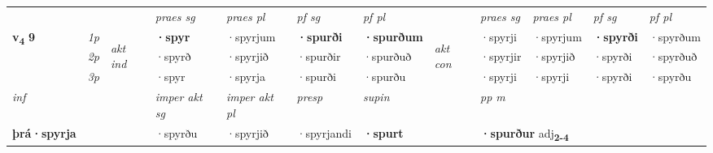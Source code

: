 \begin{longtable}[l]{X>{\footnotesize\itshape}llXXXXlXXXX}
 & &   & \textit{praes sg}  & \textit{praes pl}    & \textit{ pf sg} & \textit{pf pl} & & \textit{praes sg}  & \textit{praes pl}    & \textit{pf sg} & \textit{pf pl }  \\ \cmidrule{4-7} \cmidrule{9-12}
 \multirow{2}{*}{{{\textbf{v{\textsubscript{4}}} \Large{\textbf{9}}}}}  & 1p & \multirow{3}{*}{\begin{turn}{90}\textit{akt ind}\end{turn}} & \textbf{·spyr} & ·spyrjum & \textbf{·spurði} & \textbf{·spurðum} & \multirow{3}{*}{\begin{turn}{90}\textit{akt con}\end{turn}} &·spyrji & ·spyrjum & \textbf{·spyrði} & ·spyrðum\\*
 & 2p &  &  ·spyrð  & ·spyrjið & ·spurðir & ·spurðuð & & ·spyrjir & ·spyrjið & ·spyrði & ·spyrðuð \\*
 & 3p &  & ·spyr & ·spyrja & ·spurði & ·spurðu & & ·spyrji & ·spyrji& ·spyrði & ·spyrðu \\*
\cmidrule{4-7} \cmidrule{9-12}

   {\textit{inf}} & &  & \textit{imper akt sg} & \textit{imper akt pl}   & \textit{presp} & \textit{supin}  && \textit{pp m} \\*
  {\textbf{þrá\allowbreak ·spyrja}} & && ·spyrðu  & ·spyrjið   & ·spyrjandi &  \textbf{·spurt}  && \multicolumn{2}{l}{\textbf{·spurður} adj\textbf{\textsubscript{2-4}}} \\*

\midrule


\end{longtable}
